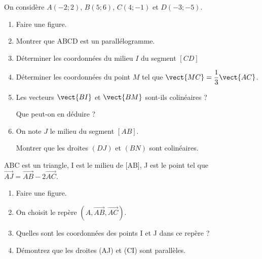 \medskip

\exo

On considère $A(-2 ;2)$, $B(5;6)$, $C(4; -1)$ et $D(-3;-5)$.

\begin{enumerate}
\item Faire une figure.
\item Montrer que ABCD est un parallélogramme.
\item Déterminer les coordonnées du milieu $I$ du segment $[CD]$
\item Déterminer les coordonnées du point $M$ tel que $\vect{MC}=\dfrac{1}{3} \vect{AC}$.
\item Les vecteurs $\vect{BI}$ et $\vect{BM}$ sont-ils colinéaires ?

Que peut-on en déduire ?
\item On note $J$ le milieu du segment $[AB]$.

Montrer que les droites $(DJ)$ et $(BN)$ sont colinéaires.
\end{enumerate}

\medskip

\exo 

ABC est un triangle, I est le milieu de [AB], J est le point tel que $\overrightarrow{AJ}=\overrightarrow{AB}-2\overrightarrow{AC}$.
\begin{enumerate}
\item Faire une figure.
\item On choisit le repère $\left( A,\overrightarrow{AB},\overrightarrow{AC}\right) .$
\item Quelles sont les coordonnées des points I et J dans ce repère ?
\item Démontrez que les droites (AJ) et (CI) sont parallèles.
\end{enumerate}


